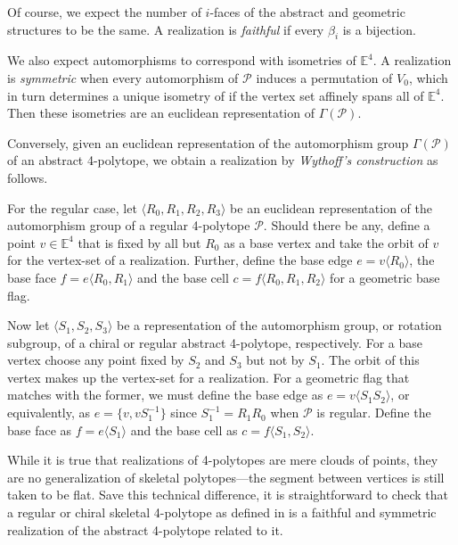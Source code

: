 \documentclass{article}
\theoremstyle{definition}
\newcommand{\E}{\mathbb{E}}
\newcommand{\p}{\mathcal{P}}
\begin{document}
	

	Of course, we expect the number of $i$-faces of the abstract and geometric structures to be the same. A realization is \textit{faithful} if every $\beta_i$ is a bijection.
	
	We also expect automorphisms to correspond with isometries of $\E^4$. A realization is \textit{symmetric} when every automorphism of $\p$ induces a permutation of $V_0$, which in turn determines a unique isometry of if the vertex set affinely spans all of $\E^4$. Then these isometries are an euclidean representation of $\Gamma(\p)$.
	
	Conversely, given an euclidean representation of the automorphism group $\Gamma(\p)$ of an abstract 4-polytope, we obtain a realization by \textit{Wythoff's construction} as follows.
	
	For the regular case, let $\langle R_0, R_1,R_2,R_3\rangle$ be an euclidean representation of the automorphism group of a regular 4-polytope $\p$. Should there be any, define a point $v\in\E^4$ that is fixed by all but $R_0$ as a base vertex and take the orbit of $v$ for the vertex-set of a realization. Further, define the base edge $e=v\langle R_0\rangle$, the base face $f=e\langle R_0,R_1\rangle$ and the base cell $c=f\langle R_0,R_1,R_2\rangle$ for a geometric base flag.
	
	Now let $\langle S_1,S_2,S_3\rangle$ be a representation of the automorphism group, or rotation subgroup, of a chiral or regular abstract 4-polytope, respectively. For a base vertex choose any point fixed by $S_2$ and $S_3$ but not by $S_1$. The orbit of this vertex makes up the vertex-set for a realization. For a geometric flag that matches with the former, we must define the base edge as $e=v\langle S_1S_2\rangle$, or equivalently, as $e=\{v,vS_1^{-1}\}$ since $S_1^{-1}=R_1R_0$ when $\p$ is regular. Define the base face as $f=e\langle S_1\rangle$ and the base cell as $c=f\langle S_1,S_2\rangle$.
	
	While it is true that realizations of 4-polytopes are mere clouds of points, they are no generalization of skeletal polytopes---the segment between vertices is still taken to be flat. Save this technical difference, it is straightforward to check that a regular or chiral skeletal 4-polytope as defined in  is a faithful and symmetric realization of the abstract 4-polytope related to it.
	
\end{document}
